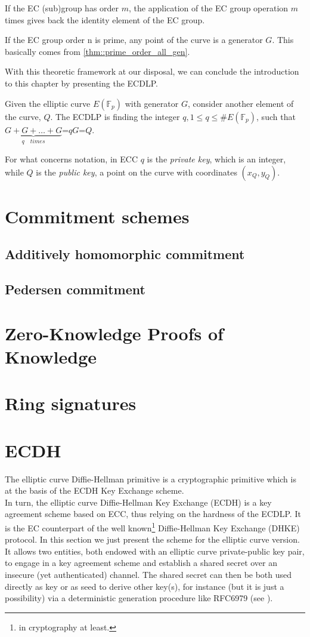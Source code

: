 \begin{myrem}
    If the EC (sub)group has order $m$, the application of the EC group operation $m$ times gives back the identity element of the EC group.
\end{myrem}
\begin{myrem}
    If the EC group order n is prime, any point of the curve is a generator $G$. This basically comes from \ref{thm::prime_order_all_gen}.
\end{myrem}
\noindent
With this theoretic framework at our disposal, we can conclude the introduction to this chapter by presenting the ECDLP.
\begin{mydef}
    Given the elliptic curve $E(\mathbb{F}_p)$ with generator $G$, consider another element of the curve, $Q$. The ECDLP is finding the integer $q, 1 \leq q \leq \#E(\mathbb{F}_p)$, such that $\underbrace{G+G+\dots+G}_{q \quad times}$=$qG$=$Q$.
\end{mydef}
\noindent
For what concerns notation, in ECC $q$ is the \textit{private key}, which is an integer, while $Q$ is the \textit{public key}, a point on the curve with coordinates $(x_Q, y_Q)$.

\section{Commitment schemes}
\subsection{Additively homomorphic commitment}
\subsection{Pedersen commitment}
\section{Zero-Knowledge Proofs of Knowledge}
\section{Ring signatures}
\section{ECDH}
The elliptic curve Diffie-Hellman primitive is a cryptographic primitive which is at the basis of the ECDH Key Exchange scheme.\\
In turn, the elliptic curve Diffie-Hellman Key Exchange (ECDH) is a key agreement scheme based on ECC, thus relying on the hardness of the ECDLP. It is the EC counterpart of the well known\footnote{in cryptography at least.} Diffie-Hellman Key Exchange (DHKE) protocol. In this section we just present the scheme for the elliptic curve version.\\
It allows two entities, both endowed with an elliptic curve private-public key pair, to engage in a key agreement scheme and establish a shared secret over an insecure (yet authenticated) channel. The shared secret can then be both used directly as key or as seed to derive other key(s), for instance (but it is just a possibility) via a deterministic generation procedure like RFC6979 (see \cite{rfc6979}).
